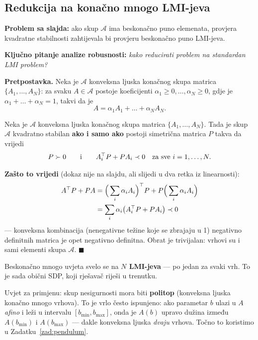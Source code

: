 \subsection{Redukcija na konačno mnogo LMI-jeva}

\textbf{Problem sa slajda:} ako skup $\mathcal{A}$ ima beskonačno puno
elemenata, provjera kvadratne stabilnosti zahtijevala bi provjeru beskonačno
puno LMI-jeva.

\textbf{Ključno pitanje analize robusnosti:} \emph{kako reducirati problem na
standardan LMI problem?}

\textbf{Pretpostavka.} Neka je $\mathcal{A}$ konveksna ljuska konačnog skupa
matrica $\{A_1,\dots,A_N\}$: za svaku $A \in \mathcal{A}$ postoje koeficijenti
$\alpha_1 \ge 0,\dots,\alpha_N \ge 0$, gdje je $\alpha_1 + \dots + \alpha_N = 1$,
takvi da je
\[
A = \alpha_1A_1 + \dots + \alpha_NA_N.
\]

\begin{teorem}
Neka je $\mathcal{A}$ konveksna ljuska konačnog skupa matrica
$\{A_1,\dots,A_N\}$. Tada je skup $\mathcal{A}$ kvadratno stabilan
\textbf{ako i samo ako} postoji simetrična matrica $P$ takva da vrijedi
\begin{equation}
\label{eq:vrhovi}
P \succ 0 \qquad\text{i}\qquad
A_i^{\top} P + PA_i \prec 0 \quad\text{za sve } i = 1,\dots,N.
\end{equation}
\end{teorem}

\textbf{Zašto to vrijedi} (dokaz nije na slajdu, ali slijedi u dva retka iz
linearnosti):
\begin{align}
A^{\top} P + PA
&= \Big(\sum_i\alpha_iA_i\Big)^{\top} P + P\Big(\sum_i\alpha_iA_i\Big) \\
&= \sum_i \alpha_i\big(A_i^{\top} P + PA_i\big) \prec 0
\end{align}
--- konveksna kombinacija (nenegativne težine koje se zbrajaju u 1) negativno
definitnih matrica je opet negativno definitna. Obrat je trivijalan: vrhovi su
i sami elementi skupa $\mathcal{A}$. $\blacksquare$

\begin{napomena}
Beskonačno mnogo uvjeta svelo se na \textbf{$N$ LMI-jeva} --- po jedan za svaki
vrh. To je sada obični SDP, koji rješavač riješi u trenutku.

Uvjet za primjenu: skup nesigurnosti mora biti \textbf{politop} (konveksna
ljuska konačno mnogo vrhova). To je vrlo često ispunjeno: ako parametar $b$
ulazi u $A$ \emph{afino} i leži u intervalu
$[b_{\min}, b_{\max}]$, onda je $A(b)$ upravo dužina između $A(b_{\min})$ i
$A(b_{\max})$ --- dakle konveksna ljuska \emph{dvaju} vrhova. Točno to koristimo
u Zadatku~\ref{zad:pendulum}.
\end{napomena}


